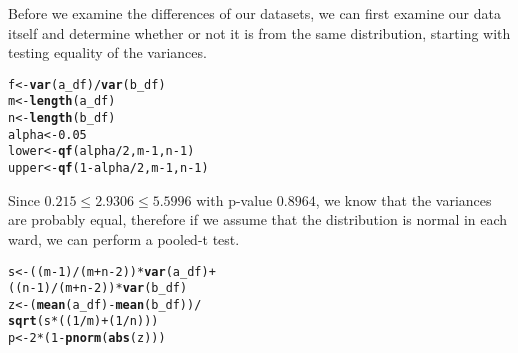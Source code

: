 \documentclass[10pt]{article}\usepackage[]{graphicx}\usepackage[]{xcolor}
\makeatletter
\newcommand{\hlnum}[1]{\textcolor[rgb]{0.686,0.059,0.569}{#1}}%
\newcommand{\hlopt}[1]{\textcolor[rgb]{0,0,0}{#1}}%
\newcommand{\hlstd}[1]{\textcolor[rgb]{0.345,0.345,0.345}{#1}}%
\newcommand{\hlkwb}[1]{\textcolor[rgb]{0.69,0.353,0.396}{#1}}%
\newcommand{\hlkwd}[1]{\textcolor[rgb]{0.737,0.353,0.396}{\textbf{#1}}}%
\newenvironment{kframe}{%
 \def\at@end@of@kframe{}%
 \ifinner\ifhmode%
  \def\at@end@of@kframe{\end{minipage}}%
  \begin{minipage}{\columnwidth}%
 \fi\fi%
 \def\FrameCommand##1{\hskip\@totalleftmargin \hskip-\fboxsep
 \colorbox{shadecolor}{##1}\hskip-\fboxsep
     \hskip-\linewidth \hskip-\@totalleftmargin \hskip\columnwidth}%
 \MakeFramed {\advance\hsize-\width
   \@totalleftmargin\z@ \linewidth\hsize
   \@setminipage}}%
 {\par\unskip\endMakeFramed%
 \at@end@of@kframe}
\newenvironment{knitrout}{}{} %
\makeatother
\begin{document}
\begin{easylist}[enumerate]
    Before we examine the differences of our datasets, we can first examine our data itself and determine whether or not
    it is from the same distribution, starting with testing equality of the variances.

\begin{knitrout}
\color{fgcolor}\begin{kframe}
\begin{alltt}
             \hlstd{f} \hlkwb{<-} \hlkwd{var}\hlstd{(a_df)} \hlopt{/} \hlkwd{var}\hlstd{(b_df)}
             \hlstd{m} \hlkwb{<-} \hlkwd{length}\hlstd{(a_df)}
             \hlstd{n} \hlkwb{<-} \hlkwd{length}\hlstd{(b_df)}
             \hlstd{alpha} \hlkwb{<-} \hlnum{0.05}
             \hlstd{lower} \hlkwb{<-} \hlkwd{qf}\hlstd{(alpha} \hlopt{/} \hlnum{2}\hlstd{, m} \hlopt{-} \hlnum{1}\hlstd{, n} \hlopt{-} \hlnum{1}\hlstd{)}
             \hlstd{upper} \hlkwb{<-} \hlkwd{qf}\hlstd{(}\hlnum{1} \hlopt{-} \hlstd{alpha} \hlopt{/} \hlnum{2}\hlstd{, m} \hlopt{-} \hlnum{1}\hlstd{, n} \hlopt{-} \hlnum{1}\hlstd{)}
\end{alltt}
\end{kframe}
\end{knitrout}


    Since $0.215 \le 2.9306 \le 5.5996$ with p-value $0.8964$, we know that the variances
    are probably equal, therefore if we assume that the distribution is normal in each ward, we can perform a pooled-t
    test.

\begin{knitrout}
\color{fgcolor}\begin{kframe}
\begin{alltt}
             \hlstd{s} \hlkwb{<-} \hlstd{((m} \hlopt{-} \hlnum{1}\hlstd{)}\hlopt{/}\hlstd{(m} \hlopt{+} \hlstd{n} \hlopt{-} \hlnum{2}\hlstd{))} \hlopt{*} \hlkwd{var}\hlstd{(a_df)} \hlopt{+}
                     \hlstd{((n} \hlopt{-} \hlnum{1}\hlstd{)}\hlopt{/}\hlstd{(m} \hlopt{+} \hlstd{n} \hlopt{-} \hlnum{2}\hlstd{))} \hlopt{*} \hlkwd{var}\hlstd{(b_df)}
             \hlstd{z} \hlkwb{<-} \hlstd{(}\hlkwd{mean}\hlstd{(a_df)} \hlopt{-} \hlkwd{mean}\hlstd{(b_df))} \hlopt{/}
                     \hlkwd{sqrt}\hlstd{(s} \hlopt{*} \hlstd{((}\hlnum{1}\hlopt{/}\hlstd{m)} \hlopt{+} \hlstd{(}\hlnum{1}\hlopt{/}\hlstd{n)))}
             \hlstd{p} \hlkwb{<-} \hlnum{2} \hlopt{*} \hlstd{(}\hlnum{1} \hlopt{-} \hlkwd{pnorm}\hlstd{(}\hlkwd{abs}\hlstd{(z)))}
\end{alltt}
\end{kframe}
\end{knitrout}



\end{easylist}
\end{document}
